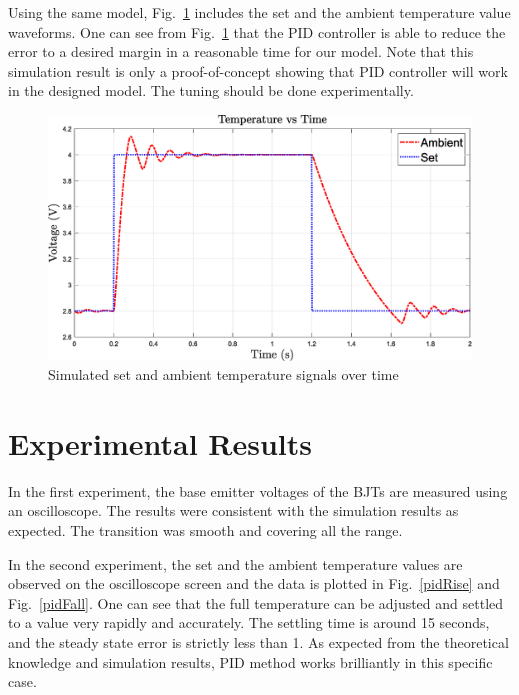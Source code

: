 \documentclass[conference]{IEEEtran}
\begin{document}
Using the same model, Fig.~\ref{pidSim} includes the set and the ambient temperature value waveforms. One can see from Fig.~\ref{pidSim} that the PID controller is able to reduce the error to a desired margin in a reasonable time for our model. Note that this simulation result is only a proof-of-concept showing that PID controller will work in the designed model. The tuning should be done experimentally.

\begin{figure}
\centerline{\includegraphics[scale=0.31]{figures/pidsim.eps}}
\caption{Simulated set and ambient temperature signals over time}
\label{pidSim}
\end{figure}


\section{Experimental Results}

In the first experiment, the base emitter voltages of the BJTs are measured using an oscilloscope. The results were consistent with the simulation results as expected. The transition was smooth and covering all the range.

In the second experiment, the set and the ambient temperature values are observed on the oscilloscope screen and the data is plotted in Fig.~\ref{pidRise} and Fig.~\ref{pidFall}. One can see that the full temperature can be adjusted and settled to a value very rapidly and accurately. The settling time is around 15 seconds, and the steady state error is strictly less than 1\celsius. As expected from the theoretical knowledge and simulation results, PID method works brilliantly in this specific case.
\end{document}
